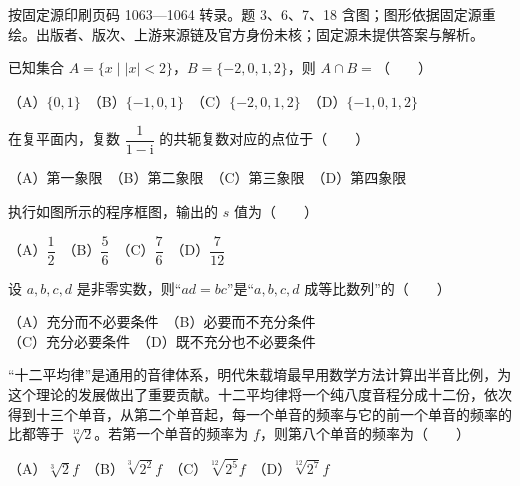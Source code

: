 


\begin{gktip}
按固定源印刷页码 1063—1064 转录。题 3、6、7、18 含图；图形依据固定源重绘。出版者、版次、上游来源链及官方身份未核；固定源未提供答案与解析。
\end{gktip}


\begin{question}
已知集合 $A=\{x\mid |x|<2\}$，$B=\{-2,0,1,2\}$，则 $A\cap B=$\mbox{（　　）}

（A）$\{0,1\}$　（B）$\{-1,0,1\}$　（C）$\{-2,0,1,2\}$　（D）$\{-1,0,1,2\}$

\end{question}
\begin{question}
在复平面内，复数 $\dfrac{1}{1-\mathrm i}$ 的共轭复数对应的点位于\mbox{（　　）}

（A）第一象限　（B）第二象限　（C）第三象限　（D）第四象限

\Needspace{0.4\textheight}
\end{question}
\begin{question}
执行如图所示的程序框图，输出的 $s$ 值为\mbox{（　　）}
\nopagebreak[4]
\begin{center}\end{center}
\nopagebreak[4]
（A）$\dfrac12$　（B）$\dfrac56$　（C）$\dfrac76$　（D）$\dfrac7{12}$

\end{question}
\begin{question}
设 $a,b,c,d$ 是非零实数，则“$ad=bc$”是“$a,b,c,d$ 成等比数列”的\mbox{（　　）}

（A）充分而不必要条件　（B）必要而不充分条件\\
（C）充分必要条件　（D）既不充分也不必要条件

\end{question}
\begin{question}
“十二平均律”是通用的音律体系，明代朱载堉最早用数学方法计算出半音比例，为这个理论的发展做出了重要贡献。十二平均律将一个纯八度音程分成十二份，依次得到十三个单音，从第二个单音起，每一个单音的频率与它的前一个单音的频率的比都等于 $\sqrt[12]{2}$。若第一个单音的频率为 $f$，则第八个单音的频率为\mbox{（　　）}

（A）$\sqrt[3]{2}f$　（B）$\sqrt[3]{2^2}f$　（C）$\sqrt[12]{2^5}f$　（D）$\sqrt[12]{2^7}f$

\Needspace{0.4\textheight}
\end{question}
